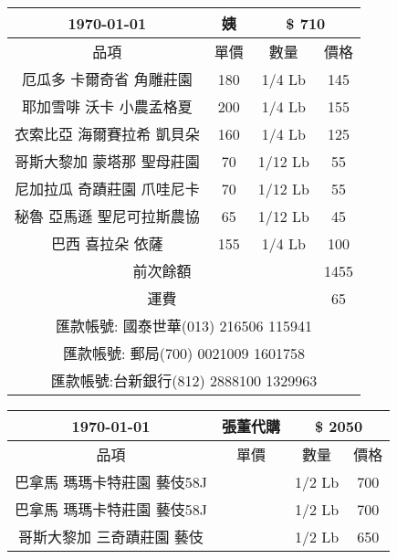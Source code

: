 \documentclass[14pt,a4paper,landspace,landscape]{extarticle}
\begin{document}
\begin{tabular}{ |c|c|c|c|}\hline
 \large \today & { \Large  姨} & \multicolumn{2}{c|}{\large \$ \Large 710} \\\hline
  品項&單價&數量&價格\\\hline
厄瓜多 卡爾奇省 角雕莊園 & 180 & 1/4 Lb & 145\\ \hline
耶加雪啡 沃卡 小農孟格夏 & 200 & 1/4 Lb & 155\\ \hline
衣索比亞  海爾賽拉希 凱貝朵 & 160 & 1/4 Lb & 125\\ \hline
哥斯大黎加 蒙塔那 聖母莊園 & 70 & 1/12 Lb & 55\\ \hline
尼加拉瓜  奇蹟莊園 爪哇尼卡 & 70 & 1/12 Lb & 55\\ \hline
秘魯 亞馬遜 聖尼可拉斯農協 & 65 & 1/12 Lb & 45\\ \hline
巴西 喜拉朵 依薩 & 155 & 1/4 Lb & 100\\ \hline
\multicolumn{3}{|c|}{前次餘額} & 1455\\\hline \multicolumn{3}{|c|}{運費} & 65\\\hline\hline
\hline\hline\multicolumn{4}{|c|}{\large 匯款帳號: 國泰世華(013) 216506 115941}\\\hline\multicolumn{4}{|c|}{\large 匯款帳號: 郵局(700) 0021009 1601758}\\\hline\multicolumn{4}{|c|}{\large 匯款帳號:台新銀行(812) 2888100 1329963}\\\hline
\end{tabular}
\bigskip\bigskip\bigskip





\begin{tabular}{ |c|c|c|c|}\hline
 \large \today & { \Large  張董代購} & \multicolumn{2}{c|}{\large \$ \Large 2050} \\\hline
  品項&單價&數量&價格\\\hline
巴拿馬 瑪瑪卡特莊園 藝伎58J &   & 1/2 Lb & 700\\ \hline
巴拿馬 瑪瑪卡特莊園 藝伎58J &   & 1/2 Lb & 700\\ \hline
哥斯大黎加 三奇蹟莊園 藝伎 &   & 1/2 Lb & 650\\ \hline
\end{tabular}
\bigskip\bigskip\bigskip
\end{document}

